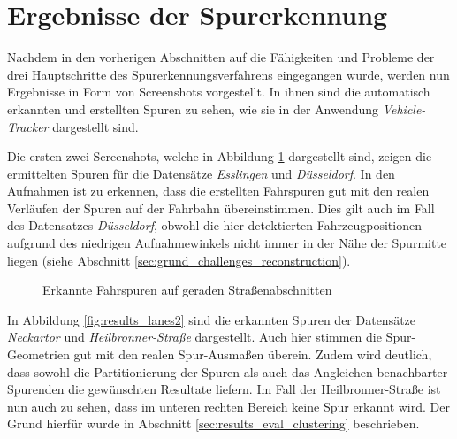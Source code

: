 \section{Ergebnisse der Spurerkennung}

Nachdem in den vorherigen Abschnitten auf die Fähigkeiten und Probleme der drei Hauptschritte des
Spurerkennungsverfahrens eingegangen wurde, werden nun Ergebnisse in Form von Screenshots vorgestellt.
In ihnen sind die automatisch erkannten und erstellten Spuren zu sehen, wie sie in der Anwendung
\textit{Vehicle-Tracker} dargestellt sind.

Die ersten zwei Screenshots, welche in Abbildung \ref{fig:results_lanes1} dargestellt sind, zeigen die ermittelten
Spuren für die Datensätze \textit{Esslingen} und \textit{Düsseldorf}.
In den Aufnahmen ist zu erkennen, dass die erstellten Fahrspuren gut mit den realen Verläufen der
Spuren auf der Fahrbahn übereinstimmen.
Dies gilt auch im Fall des Datensatzes \textit{Düsseldorf}, obwohl die hier detektierten Fahrzeugpositionen
aufgrund des niedrigen Aufnahmewinkels nicht immer in der Nähe der Spurmitte liegen
(siehe Abschnitt \ref{sec:grund_challenges_reconstruction}).

\begin{figure}[H]
    \centering
    \caption{Erkannte Fahrspuren auf geraden Straßenabschnitten}
    \label{fig:results_lanes1}
\end{figure}

In Abbildung \ref{fig:results_lanes2} sind die erkannten Spuren der Datensätze \textit{Neckartor} und \textit{Heilbronner-Straße}
dargestellt. Auch hier stimmen die Spur-Geometrien gut mit den realen Spur-Ausmaßen überein. Zudem wird deutlich,
dass sowohl die Partitionierung der Spuren als auch das Angleichen benachbarter Spurenden die gewünschten Resultate liefern.
Im Fall der Heilbronner-Straße ist nun auch zu sehen, dass im unteren rechten Bereich keine Spur erkannt wird.
Der Grund hierfür wurde in Abschnitt \ref{sec:results_eval_clustering} beschrieben.


